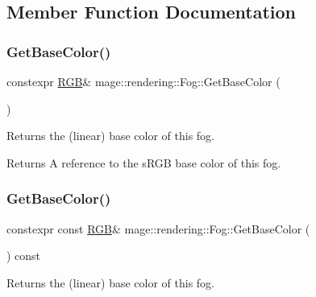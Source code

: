 \subsection{Member Function Documentation}
\hypertarget{classmage_1_1rendering_1_1_fog_af2ba57f86df0f681ad6b67cba5fc8dc1}{}\label{classmage_1_1rendering_1_1_fog_af2ba57f86df0f681ad6b67cba5fc8dc1} 
\subsubsection{\texorpdfstring{Get\+Base\+Color()}{GetBaseColor()}\hspace{0.1cm}{\footnotesize\ttfamily [1/2]}}
{\footnotesize\ttfamily constexpr \hyperlink{structmage_1_1_r_g_b}{R\+GB}\& mage\+::rendering\+::\+Fog\+::\+Get\+Base\+Color (\begin{DoxyParamCaption}{ }\end{DoxyParamCaption})\hspace{0.3cm}{\ttfamily [noexcept]}}

Returns the (linear) base color of this fog.

\begin{DoxyReturn}{Returns}
A reference to the s\+R\+GB base color of this fog. 
\end{DoxyReturn}
\hypertarget{classmage_1_1rendering_1_1_fog_a2a1441d2a0cdbc074260fa1af7fc656a}{}\label{classmage_1_1rendering_1_1_fog_a2a1441d2a0cdbc074260fa1af7fc656a} 
\subsubsection{\texorpdfstring{Get\+Base\+Color()}{GetBaseColor()}\hspace{0.1cm}{\footnotesize\ttfamily [2/2]}}
{\footnotesize\ttfamily constexpr const \hyperlink{structmage_1_1_r_g_b}{R\+GB}\& mage\+::rendering\+::\+Fog\+::\+Get\+Base\+Color (\begin{DoxyParamCaption}{ }\end{DoxyParamCaption}) const\hspace{0.3cm}{\ttfamily [noexcept]}}

Returns the (linear) base color of this fog.

